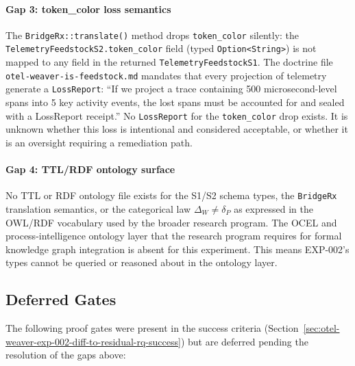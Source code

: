 \paragraph{Gap 3: token\_color loss semantics}
The \texttt{BridgeRx::translate()} method drops \texttt{token\_color} silently:
the \texttt{TelemetryFeedstockS2.token\_color} field (typed
\texttt{Option<String>}) is not mapped to any field in the returned
\texttt{TelemetryFeedstockS1}. The doctrine file
\texttt{otel-weaver-is-feedstock.md} mandates that every projection of telemetry
generate a \texttt{LossReport}: ``If we project a trace containing 500
microsecond-level spans into 5 key activity events, the lost spans must be accounted
for and sealed with a LossReport receipt.'' No \texttt{LossReport} for the
\texttt{token\_color} drop exists. It is unknown whether this loss is intentional
and considered acceptable, or whether it is an oversight requiring a remediation
path.

\paragraph{Gap 4: TTL/RDF ontology surface}
No TTL or RDF ontology file exists for the S1/S2 schema types, the \texttt{BridgeRx}
translation semantics, or the categorical law $\Delta_W \neq \delta_P$ as expressed
in the OWL/RDF vocabulary used by the broader research program. The OCEL and
process-intelligence ontology layer that the research program requires for formal
knowledge graph integration is absent for this experiment. This means EXP-002's
types cannot be queried or reasoned about in the ontology layer.

\subsection{Deferred Gates}
\label{sec:otel-weaver-exp-002-diff-to-residual-open-deferred}

The following proof gates were present in the success criteria
(Section~\ref{sec:otel-weaver-exp-002-diff-to-residual-rq-success}) but are deferred
pending the resolution of the gaps above:

